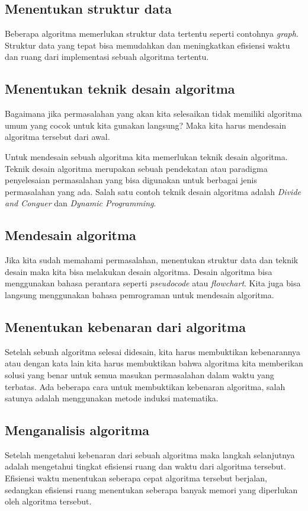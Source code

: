 \subsection{Menentukan struktur data}
Beberapa algoritma memerlukan struktur data tertentu seperti contohnya \textit{graph}. Struktur data yang tepat bisa memudahkan dan meningkatkan efisiensi waktu dan ruang dari implementasi sebuah algoritma tertentu. 

\subsection{Menentukan teknik desain algoritma}
Bagaimana jika permasalahan yang akan kita selesaikan tidak memiliki algoritma umum yang cocok untuk kita gunakan langsung? Maka kita harus mendesain algoritma tersebut dari awal. 

Untuk mendesain sebuah algoritma kita memerlukan teknik desain algoritma. Teknik desain algoritma merupakan sebuah pendekatan atau paradigma penyelesaian permasalahan yang bisa digunakan untuk berbagai jenis permasalahan yang ada. Salah satu contoh teknik desain algoritma adalah \textit{Divide and Conguer} dan \textit{Dynamic Programming}.

\subsection{Mendesain algoritma}
Jika kita sudah memahami permasalahan, menentukan struktur data dan teknik desain maka kita bisa melakukan desain algoritma. Desain algoritma bisa menggunakan bahasa perantara seperti \textit{pseudocode} atau \textit{flowchart}. Kita juga bisa langsung menggunakan bahasa pemrograman untuk mendesain algoritma. 

\subsection{Menentukan kebenaran dari algoritma}
Setelah sebuah algoritma selesai didesain, kita harus membuktikan kebenarannya atau dengan kata lain kita harus membuktikan bahwa algoritma kita memberikan solusi yang benar untuk semua masukan permasalahan dalam waktu yang terbatas. Ada beberapa cara untuk membuktikan kebenaran algoritma, salah satunya adalah menggunakan metode induksi matematika.

\subsection{Menganalisis algoritma}
Setelah mengetahui kebenaran dari sebuah algoritma maka langkah selanjutnya adalah mengetahui tingkat efisiensi ruang dan waktu dari algoritma tersebut. Efisiensi waktu menentukan seberapa cepat algoritma tersebut berjalan, sedangkan efisiensi ruang menentukan seberapa banyak memori yang diperlukan oleh algoritma tersebut. 


